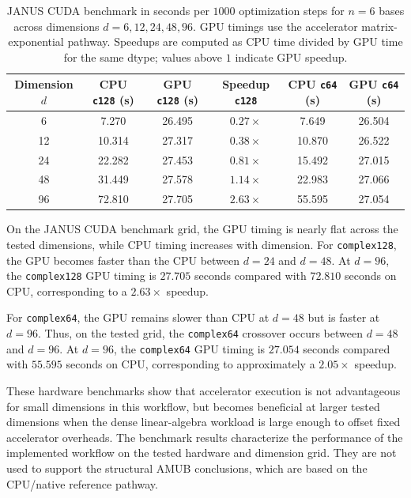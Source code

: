 \documentclass[a4paper,twocolumn,11pt,amsfonts,amssymb]{quantumarticle}
\begin{document}
\begin{table}[ht]
  \caption{JANUS CUDA benchmark in seconds per \(1000\) optimization steps for \(n=6\) bases across dimensions \(d=6,12,24,48,96\). GPU timings use the accelerator matrix-exponential pathway. Speedups are computed as CPU time divided by GPU time for the same dtype; values above \(1\) indicate GPU speedup.}
  \label{tab:hardware-benchmarks-janus}
  \begin{tabular}{cccccc}
    \toprule
    Dimension \(d\) &
    CPU \texttt{c128} (s) &
    GPU \texttt{c128} (s) &
    Speedup \texttt{c128} &
    CPU \texttt{c64} (s) &
    GPU \texttt{c64} (s) \\
    \midrule
    6  & 7.270  & 26.495 & \(0.27\times\) & 7.649  & 26.504 \\
    12 & 10.314 & 27.317 & \(0.38\times\) & 10.870 & 26.522 \\
    24 & 22.282 & 27.453 & \(0.81\times\) & 15.492 & 27.015 \\
    48 & 31.449 & 27.578 & \(1.14\times\) & 22.983 & 27.066 \\
    96 & 72.810 & 27.705 & \(2.63\times\) & 55.595 & 27.054 \\
    \bottomrule
  \end{tabular}
\end{table}

On the JANUS CUDA benchmark grid, the GPU timing is nearly flat across the tested dimensions, while CPU timing increases with dimension. For \texttt{complex128}, the GPU becomes faster than the CPU between \(d=24\) and \(d=48\). At \(d=96\), the \texttt{complex128} GPU timing is \(27.705\) seconds compared with \(72.810\) seconds on CPU, corresponding to a \(2.63\times\) speedup.

For \texttt{complex64}, the GPU remains slower than CPU at \(d=48\) but is faster at \(d=96\). Thus, on the tested grid, the \texttt{complex64} crossover occurs between \(d=48\) and \(d=96\). At \(d=96\), the \texttt{complex64} GPU timing is \(27.054\) seconds compared with \(55.595\) seconds on CPU, corresponding to approximately a \(2.05\times\) speedup.

These hardware benchmarks show that accelerator execution is not advantageous for small dimensions in this workflow, but becomes beneficial at larger tested dimensions when the dense linear-algebra workload is large enough to offset fixed accelerator overheads. The benchmark results characterize the performance of the implemented workflow on the tested hardware and dimension grid. They are not used to support the structural AMUB conclusions, which are based on the CPU/native reference pathway.
\end{document}
